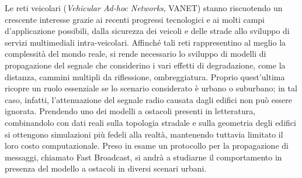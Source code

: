
Le reti veicolari (\textit{Vehicular Ad-hoc Networks}, VANET) stanno riscuotendo un crescente interesse
grazie ai recenti progressi tecnologici e ai molti campi d'applicazione possibili, dalla sicurezza dei veicoli
e delle strade allo sviluppo di servizi multimediali intra-veicolari.
Affinché tali reti rappresentino al meglio la complessità del mondo reale, si rende necessario lo sviluppo di modelli di propagazione del segnale
che considerino i vari effetti di degradazione, come la distanza, cammini multipli da riflessione, ombreggiatura.
Proprio quest'ultima ricopre un ruolo essenziale se lo scenario considerato è urbano o suburbano; in tal caso, infatti,
l'attenuazione del segnale radio causata dagli edifici non può essere ignorata.
Prendendo uno dei modelli a ostacoli presenti in letteratura,
combinandolo con dati reali sulla topologia stradale e sulla geometria degli edifici
si ottengono simulazioni più fedeli alla realtà, mantenendo tuttavia limitato il loro costo computazionale.
Preso in esame un protocollo per la propagazione di messaggi, chiamato Fast Broadcast,
si andrà a studiarne il comportamento in presenza del modello a ostacoli in diversi scenari urbani.
%
